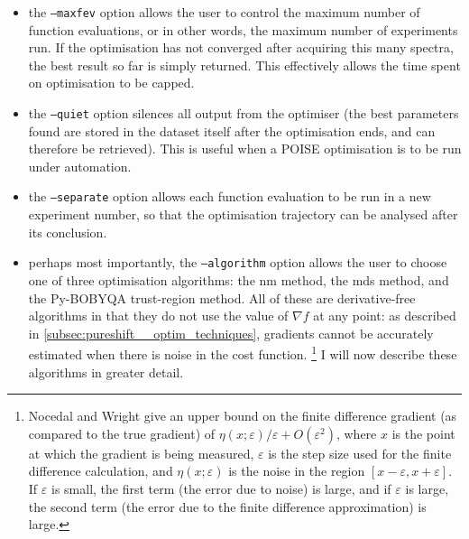 \begin{itemize}
    \item the \texttt{--maxfev} option allows the user to control the maximum number of function evaluations, or in other words, the maximum number of experiments run.
        If the optimisation has not converged after acquiring this many spectra, the best result so far is simply returned.
        This effectively allows the time spent on optimisation to be capped.

    \item the \texttt{--quiet} option silences all output from the optimiser (the best parameters found are stored in the dataset itself after the optimisation ends, and can therefore be retrieved).
        This is useful when a POISE optimisation is to be run under automation.
        
    \item the \texttt{--separate} option allows each function evaluation to be run in a new experiment number, so that the optimisation trajectory can be analysed after its conclusion.

    \item perhaps most importantly, the \texttt{--algorithm} option allows the user to choose one of three optimisation algorithms: the \acf{nm} method\autocite{Nelder1965TCJ}, the \acf{mds} method\autocite{Torczon1989,DennisJr1991SIAMJO}, and the Py-BOBYQA trust-region method\autocite{Powell2009Proc,Cartis2019ACMTMS}.
        All of these are derivative-free algorithms in that they do not use the value of $\nabla f$ at any point: as described in \cref{subsec:pureshift__optim_techniques}, gradients cannot be accurately estimated when there is noise in the cost function.%
        \footnote{Nocedal and Wright\autocite{Nocedal2006} give an upper bound on the finite difference gradient (as compared to the true gradient) of $\eta(x;\varepsilon)/\varepsilon + O(\varepsilon^2)$, where $x$ is the point at which the gradient is being measured, $\varepsilon$ is the step size used for the finite difference calculation, and $\eta(x;\varepsilon)$ is the noise in the region $[x - \varepsilon, x + \varepsilon]$. If $\varepsilon$ is small, the first term (the error due to noise) is large, and if $\varepsilon$ is large, the second term (the error due to the finite difference approximation) is large.}
        I will now describe these algorithms in greater detail.
\end{itemize}

